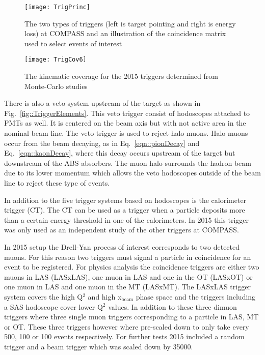 \begin{figure}[h!t]
  \centering
  \texttt{[image: TrigPrinc]}
  \caption{The two types of triggers (left is target pointing and right is
    energy loss) at COMPASS and an illustration of the coincidence matrix used
    to select events of interest}
  \label{fig::TrigPrinc}
\end{figure}

\begin{figure}[h!t]
  \centering
  \texttt{[image: TrigCov6]}
  \caption{The kinematic coverage for the 2015 triggers determined from
    Monte-Carlo studies}
  \label{fig::TrigCov6}
\end{figure}


There is also a veto system upstream of the target as shown in
Fig.~\ref{fig::TriggerElements}.  This veto trigger consist of hodoscopes
attached to PMTs as well.  It is centered on the beam axis but with not active
area in the nominal beam line.  The veto trigger is used to reject halo muons.
Halo muons occur from the beam decaying, as in Eq.~\ref{eqn::pionDecay} and
Eq.~\ref{eqn::kaonDecay}, where this decay occurs upstream of the target but
downstream of the ABS absorbers.  The muon halo surrounds the hadron beam due to
its lower momentum which allows the veto hodoscopes outside of the beam line to
reject these type of events.

In addition to the five trigger systems based on hodoscopes is the calorimeter
trigger (CT).  The CT can be used as a trigger when a particle deposits more
than a certain energy threshold in one of the calorimeters.  In 2015 this
trigger was only used as an independent study of the other triggers at
COMPASS. \par

In 2015 setup the Drell-Yan process of interest corresponds to two detected
muons.  For this reason two triggers must signal a particle in coincidence for
an event to be registered.  For physics analysis the coincidence triggers are
either two muons in LAS (LASxLAS), one muon in LAS and one in the OT (LASxOT) or
one muon in LAS and one muon in the MT (LASxMT).  The LASxLAS trigger system
covers the high Q$^2$ and high x$_{\mathrm{beam}}$ phase space and the triggers
including a SAS hodoscope cover lower Q$^2$ values.  In addition to these three
dimuon triggers where three single muon triggers corresponding to a particle in
LAS, MT or OT.  These three triggers however where pre-scaled down to only take
every 500, 100 or 100 events respectively.  For further tests 2015 included a
random trigger and a beam trigger which was scaled down by 35000.


